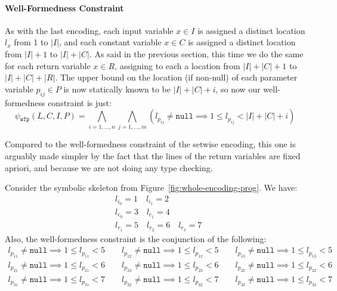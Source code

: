 \paragraph{Well-Formedness Constraint}
\label{sec:whole-well-formedness-constraint}

As with the last encoding, each input variable $x \in I$ is assigned a distinct
location $l_x$ from 1 to $|I|$, and each constant variable $x \in C$ is assigned
a distinct location from $|I| + 1$ to $|I| + |C|$.
As said in the previous section, this time we do the same for each return
variable $x \in R$, assigning to each a location from $|I| + |C| + 1$ to
$|I| + |C| + |R|$.
The upper bound on the location (if non-null) of each parameter variable $p_{ij}
\in P$ is now statically known to be $|I| + |C| + i$, so now our well-formedness
constraint is just:
%
\[
  \psi{}_{\mathtt{wfp}}(L,C,I,P) =
  \bigwedge_{i = 1, \ldots, n}\bigwedge_{j = 1, \ldots, m}
  (l_{p_{ij}} \neq \mathtt{null} \implies 1 \leq l_{p_{ij}} < |I| + |C| + i)
\]

\noindent
Compared to the well-formedness constraint of the setwise encoding, this one is
arguably made simpler by the fact that the lines of the return variables are
fixed apriori, and because we are not doing any type checking.

\begin{example}
  Consider the symbolic skeleton from Figure~\ref{fig:whole-encoding-prog}.
  We have:
  \begin{align*}
    &l_{i_0} = 1 \quad l_{i_1} = 2 \\
    &l_{c_0} = 3 \quad l_{c_1} = 4 \\
    &l_{r_1} = 5 \quad l_{r_2} = 6 \quad l_{r_3} = 7
  \end{align*}
  Also, the well-formedness constraint is the conjunction of the following:
  \begin{align*}
           l_{p_{11}} \neq \mathtt{null} \implies 1 \leq l_{p_{11}} < 5
    \qquad l_{p_{12}} \neq \mathtt{null} \implies 1 \leq l_{p_{12}} < 5
    \qquad l_{p_{13}} \neq \mathtt{null} \implies 1 \leq l_{p_{13}} < 5 \\
           l_{p_{21}} \neq \mathtt{null} \implies 1 \leq l_{p_{21}} < 6
    \qquad l_{p_{23}} \neq \mathtt{null} \implies 1 \leq l_{p_{23}} < 6
    \qquad l_{p_{22}} \neq \mathtt{null} \implies 1 \leq l_{p_{22}} < 6 \\
           l_{p_{31}} \neq \mathtt{null} \implies 1 \leq l_{p_{31}} < 7
    \qquad l_{p_{32}} \neq \mathtt{null} \implies 1 \leq l_{p_{32}} < 7
    \qquad l_{p_{33}} \neq \mathtt{null} \implies 1 \leq l_{p_{33}} < 7
  \end{align*}
\end{example}
%
